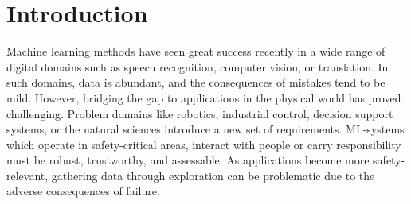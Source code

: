 \chapter{Introduction}
\label{toc:introduction}





Machine learning methods have seen great success recently in a wide range of digital domains such as speech recognition, computer vision, or translation.
In such domains, data is abundant, and the consequences of mistakes tend to be mild.
However, bridging the gap to applications in the physical world has proved challenging.
Problem domains like robotics, industrial control, decision support systems, or the natural sciences introduce a new set of requirements.
ML-systems which operate in safety-critical areas, interact with people or carry responsibility must be robust, trustworthy, and assessable.
As applications become more safety-relevant, gathering data through exploration can be problematic due to the adverse consequences of failure.

